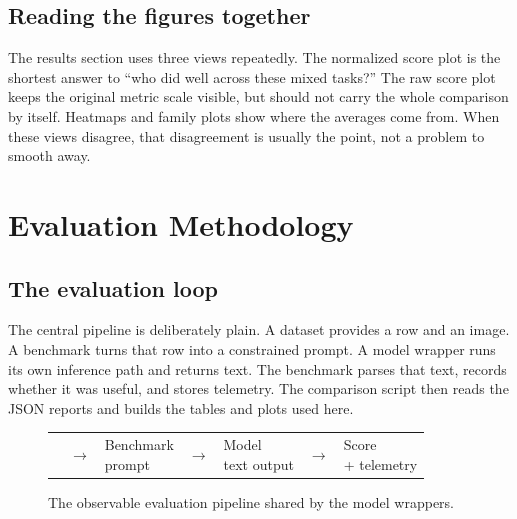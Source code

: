 \documentclass[11pt,a4paper]{report}
\begin{document}
\section{Reading the figures together}
The results section uses three views repeatedly.  The normalized score plot is
the shortest answer to ``who did well across these mixed tasks?''  The raw
score plot keeps the original metric scale visible, but should not carry the
whole comparison by itself.  Heatmaps and family plots show where the averages
come from.  When these views disagree, that disagreement is usually the point,
not a problem to smooth away.

\clearpage
\chapter{Evaluation Methodology}

\section{The evaluation loop}
The central pipeline is deliberately plain.  A dataset provides a row and an
image.  A benchmark turns that row into a constrained prompt.  A model wrapper
runs its own inference path and returns text.  The benchmark parses that text,
records whether it was useful, and stores telemetry.  The comparison script
then reads the JSON reports and builds the tables and plots used here.

\begin{figure}[H]
\centering
\setlength{\tabcolsep}{5pt}
\begin{tabular}{>{\centering\arraybackslash}p{25mm} c
                >{\centering\arraybackslash}p{30mm} c
                >{\centering\arraybackslash}p{29mm} c
                >{\centering\arraybackslash}p{29mm}}
\fcolorbox{accent}{soft}{\parbox{22mm}{\centering Dataset\\row + image}} &
$\rightarrow$ &
\fcolorbox{accent}{soft}{\parbox{27mm}{\centering Benchmark\\prompt}} &
$\rightarrow$ &
\fcolorbox{accent}{soft}{\parbox{26mm}{\centering Model\\text output}} &
$\rightarrow$ &
\fcolorbox{accent}{soft}{\parbox{26mm}{\centering Score\\+ telemetry}}\\
\end{tabular}
\caption{The observable evaluation pipeline shared by the model wrappers.}
\label{fig:pipeline}
\end{figure}
\end{document}
